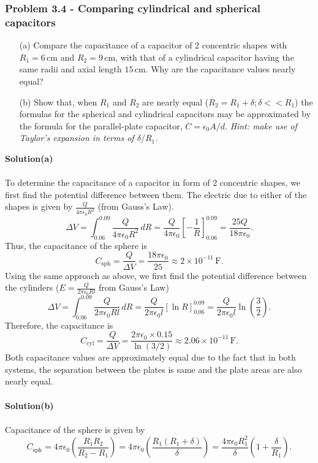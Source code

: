 \documentclass{article}
\begin{document}
\subsubsection*{Problem 3.4 - Comparing cylindrical and spherical capacitors}
\begin{enumerate}
    \item[(a)]Compare the capacitance of a capacitor of 2 concentric shapes with $R_1=6\,$cm and $R_2=9\,$cm, with that of a cylindrical capacitor having the same radii and axial length $15\,$cm. Why are the capacitance values nearly equal? 
    \item[(b)]Show that, when $R_1$ and $R_2$ are nearly equal ($R_2=R_1+\delta;\delta<<R_1$) the formulas for the spherical and cylindrical capacitors may be approximated by the formula for the parallel-plate capacitor, $C=\epsilon_0A/d$.
    \textit{Hint: make use of Taylor's expansion in terms of $\delta/R_1$.}
\end{enumerate}
\textbf{Solution(a)}
\\
\\To determine the capacitance of a capacitor in form of 2 concentric shapes, we first find the potential difference between them. The electric due to either of the shapes is given by $\frac{Q}{4\pi\epsilon_0R^2}$ (from Gauss's Law). 
\[\Delta V=\int_{0.06}^{0.09}\frac{Q}{4\pi\epsilon_0R^2}\,dR=\frac{Q}{4\pi\epsilon_0}\left[-\frac{1}{R}\right]_{0.06}^{0.09}=\frac{25Q}{18\pi\epsilon_0}.\]
Thus, the capacitance of the sphere is
\[C_{\text{sph}}=\frac{Q}{\Delta V}=\frac{18\pi\epsilon_0}{25}\approx2\times10^{-11}\,\text{F}.\]
Using the same approach as above, we first find the potential difference between the cylinders ($E=\frac{Q}{2\pi\epsilon_0Rl}$ from Gauss's Law)
\[\Delta V=\int_{0.06}^{0.09}\frac{Q}{2\pi\epsilon_0Rl}\,dR=\frac{Q}{2\pi\epsilon_0l}\left[\ln R\right]_{0.06}^{0.09}=\frac{Q}{2\pi\epsilon_0l}\ln\left(\frac{3}{2}\right).\]
Therefore, the capacitance is
\[C_{\text{cyl}}=\frac{Q}{\Delta V}=\frac{2\pi\epsilon_0\times0.15}{\ln(3/2)}\approx2.06\times10^{-11}\,\text{F}.\]
Both capacitance values are approximately equal due to the fact that in both systems, the separation between the plates is same and the plate areas are also nearly equal.
\\
\\\textbf{Solution(b)}
\\
\\Capacitance of the sphere is given by
\[C_{\text{sph}}=4\pi\epsilon_0\left(\frac{R_1R_2}{R_2-R_1}\right)=4\pi\epsilon_0\left(\frac{R_1(R_1+\delta)}{\delta}\right)=\frac{4\pi\epsilon_0R_1^2}{\delta}\left(1+\frac{\delta}{R_1}\right).\]
\end{document}
